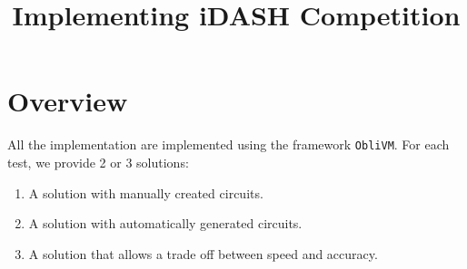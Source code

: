 \documentclass{article}
\title{Implementing iDASH Competition}
\begin{document}
\section{Overview}
All the implementation are implemented using the framework {\tt ObliVM}. For each test, we provide 2 or 3 solutions:
\begin{enumerate}
\item A solution with manually created circuits.
\item A solution with automatically generated circuits.
\item A solution that allows a trade off between speed and accuracy.
\end{enumerate}


%
\end{document}
